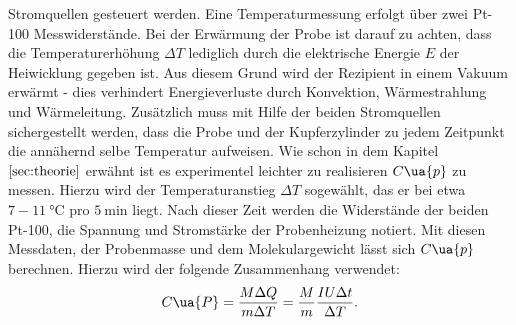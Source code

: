 Stromquellen gesteuert werden. Eine Temperaturmessung erfolgt über zwei
Pt-100 Messwiderstände. Bei der Erwärmung der Probe ist darauf zu achten, dass
die Temperaturerhöhung $\Delta T$ lediglich durch die elektrische Energie $E$
der Heiwicklung gegeben ist. Aus diesem Grund wird der Rezipient in einem
Vakuum erwärmt - dies verhindert Energieverluste durch Konvektion, Wärmestrahlung und
Wärmeleitung. Zusätzlich muss mit Hilfe der beiden Stromquellen sichergestellt
werden, dass die Probe und der Kupferzylinder zu jedem Zeitpunkt die annähernd
selbe Temperatur aufweisen. Wie schon in dem Kapitel $\ref{sec:theorie}$ erwähnt
ist es experimentel leichter zu realisieren $C\ua{p}$ zu messen.
Hierzu wird der Temperaturanstieg $\Delta T$ sogewählt, das er bei
etwa $7-\SI{11}{\degreeCelsius}$ pro $\SI{5}{\minute}$ liegt. Nach dieser Zeit werden die
Widerstände der beiden Pt-100, die Spannung und Stromstärke der Probenheizung notiert.
Mit diesen Messdaten, der Probenmasse und dem Molekulargewicht lässt sich $C\ua{p}$
berechnen. Hierzu wird der folgende Zusammenhang verwendet:
\begin{equation}
  \label{eq: C_P}
  C\ua{P}=\frac{M \Delta Q}{m\Delta T} = \frac{M}{m}\frac{IU\Delta t}{\Delta T}.
\end{equation}
